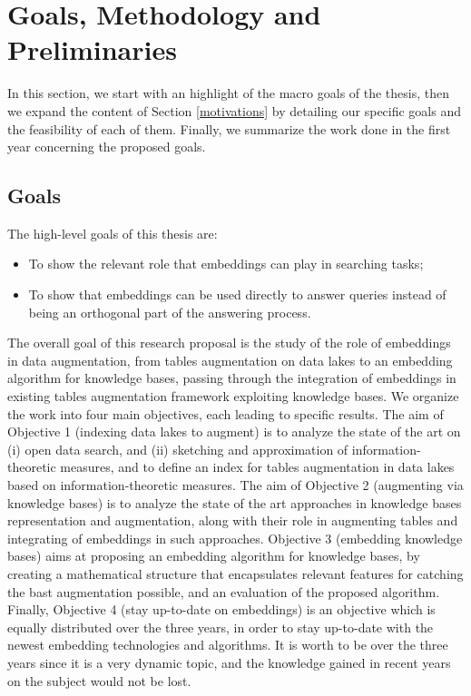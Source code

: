 \section{Goals, Methodology and Preliminaries}\label{goals}
In this section, we start with an highlight of the macro goals of the thesis, then we expand the content of Section \ref{motivations} by detailing our specific goals and the feasibility of each of them. Finally, we summarize the work done in the first year concerning the proposed goals.

\subsection{Goals}\label{sub_goals}
The high-level goals of this thesis are:
\begin{itemize}
    \item To show the relevant role that embeddings can play in searching tasks;
    \item To show that embeddings can be used directly to answer queries instead of being an orthogonal part of the answering process.
\end{itemize}

The overall goal of this research proposal is the study of the role of embeddings in data augmentation, from tables augmentation on data lakes to an embedding algorithm for knowledge bases, passing through the integration of embeddings in existing tables augmentation framework exploiting knowledge bases. We organize the work into four main objectives, each leading to specific results. 
The aim of Objective 1 (indexing data lakes to augment) is to analyze the state of the art on (i) open data search, and (ii) sketching and approximation of information-theoretic measures, and to define an index for tables augmentation in data lakes based on information-theoretic measures. 
The aim of Objective 2 (augmenting via knowledge bases) is to analyze the state of the art approaches in knowledge bases representation and augmentation, along with their role in augmenting tables and integrating of embeddings in such approaches. 
Objective 3 (embedding knowledge bases) aims at proposing an embedding algorithm for knowledge bases, by creating a mathematical structure that encapsulates relevant features for catching the bast augmentation possible, and an evaluation of the proposed algorithm. 
Finally, Objective 4 (stay up-to-date on embeddings) is an objective which is equally distributed over the three years, in order to stay up-to-date with the newest embedding technologies and algorithms. It is worth to be over the three years since it is a very dynamic topic, and the knowledge gained in recent years on the subject would not be lost.

